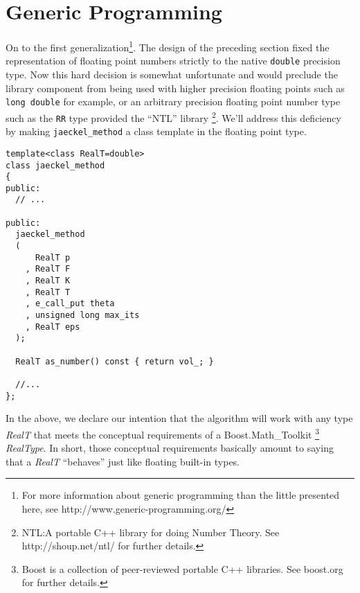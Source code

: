 \documentclass[a4paper,twoside,twocolumn]{article}
\begin{document}
\section{Generic Programming}
On to the first generalization\footnote{\tiny For more information
about generic programming than the little presented here, see
http://www.generic-programming.org/}. The design of the preceding
section fixed the representation of floating point numbers strictly to
the native \verb|double| precision type. Now this hard decision is
somewhat unfortunate and would preclude the library component from
being used with higher precision floating points such as 
\verb|long double| for example, or an arbitrary precision floating
point number type such as the \verb|RR| type provided the ``NTL''
library \footnote{\tiny NTL:A portable C++ library for doing Number
Theory. See http://shoup.net/ntl/ for further details.}. We'll address
this deficiency by making \verb|jaeckel_method| a class template in
the floating point type.
\begin{verbatim}
template<class RealT=double>
class jaeckel_method
{
public:
  // ...

public:
  jaeckel_method
  (
      RealT p
    , RealT F
    , RealT K
    , RealT T
    , e_call_put theta
    , unsigned long max_its
    , RealT eps
  );

  RealT as_number() const { return vol_; }

  //...
};
\end{verbatim}
In the above, we declare our intention that the algorithm will work
with any type \emph{RealT} that meets the conceptual requirements of a
Boost.Math\_Toolkit \footnote{\tiny Boost is a collection of peer-reviewed
portable C++ libraries. See boost.org for further details.}
\emph{RealType}. In short, those conceptual requirements basically
amount to saying that a \emph{RealT} ``behaves'' just like floating
built-in types.
\end{document}
